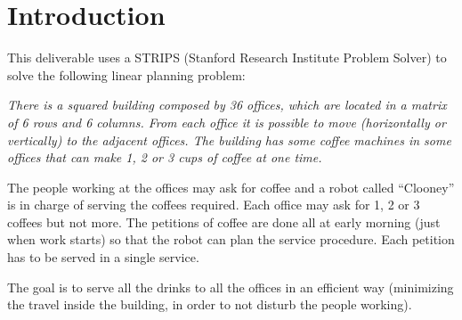 \section{Introduction}

This deliverable uses a STRIPS (Stanford Research Institute Problem Solver) to solve the following linear planning problem:

\begin{displayquote}
\itshape
There is a squared building composed by 36 offices, which are located in a matrix of 6 rows and 6 columns. From each office it is possible to move (horizontally or vertically) to the adjacent offices. The building has some coffee machines in some offices that can make 1, 2 or 3 cups of coffee at one time. 	

The people working at the offices may ask for coffee and a robot called “Clooney” is in charge of serving the coffees required. Each office may ask for 1, 2 or 3 coffees but not more. The petitions of coffee are done all at early morning (just when work starts) so that the robot can plan the service procedure. Each petition has to be served in a single service.

The goal is to serve all the drinks to all the offices in an efficient way (minimizing the travel inside the building, in order to not disturb the people working).
\end{displayquote}

